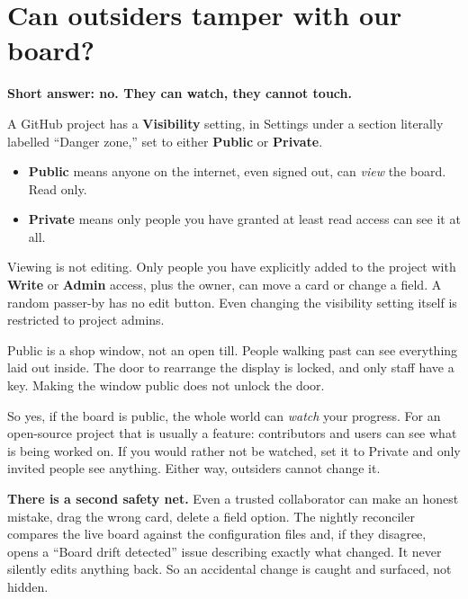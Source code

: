 \documentclass[11pt,a4paper]{report}
\begin{document}
\chapter{Can outsiders tamper with our board?}

\textbf{Short answer: no. They can watch, they cannot touch.}

A GitHub project has a \textbf{Visibility} setting, in Settings under a section
literally labelled ``Danger zone,'' set to either \textbf{Public} or
\textbf{Private}.

\begin{itemize}[leftmargin=1.4em,itemsep=2pt]
  \item \textbf{Public} means anyone on the internet, even signed out, can
        \emph{view} the board. Read only.
  \item \textbf{Private} means only people you have granted at least read access can
        see it at all.
\end{itemize}

Viewing is not editing. Only people you have explicitly added to the project with
\textbf{Write} or \textbf{Admin} access, plus the owner, can move a card or change a
field. A random passer-by has no edit button. Even changing the visibility setting
itself is restricted to project admins.

\begin{plainenglish}
Public is a shop window, not an open till. People walking past can see everything
laid out inside. The door to rearrange the display is locked, and only staff have a
key. Making the window public does not unlock the door.
\end{plainenglish}

So yes, if the board is public, the whole world can \emph{watch} your progress. For
an open-source project that is usually a feature: contributors and users can see
what is being worked on. If you would rather not be watched, set it to Private and
only invited people see anything. Either way, outsiders cannot change it.

\begin{notebox}
\textbf{There is a second safety net.} Even a trusted collaborator can make an
honest mistake, drag the wrong card, delete a field option. The nightly reconciler
compares the live board against the configuration files and, if they disagree, opens
a ``Board drift detected'' issue describing exactly what changed. It never silently
edits anything back. So an accidental change is caught and surfaced, not hidden.
\end{notebox}
\end{document}
